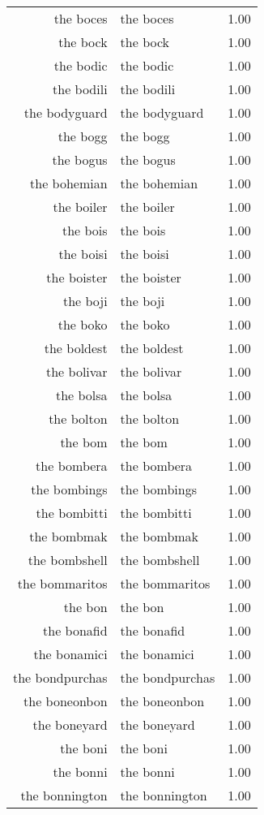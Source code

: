 \begin{table}[ht]
\begin{tabular}{rlr}
  the boces & the boces & 1.00 \\ 
  the bock & the bock & 1.00 \\ 
  the bodic & the bodic & 1.00 \\ 
  the bodili & the bodili & 1.00 \\ 
  the bodyguard & the bodyguard & 1.00 \\ 
  the bogg & the bogg & 1.00 \\ 
  the bogus & the bogus & 1.00 \\ 
  the bohemian & the bohemian & 1.00 \\ 
  the boiler & the boiler & 1.00 \\ 
  the bois & the bois & 1.00 \\ 
  the boisi & the boisi & 1.00 \\ 
  the boister & the boister & 1.00 \\ 
  the boji & the boji & 1.00 \\ 
  the boko & the boko & 1.00 \\ 
  the boldest & the boldest & 1.00 \\ 
  the bolivar & the bolivar & 1.00 \\ 
  the bolsa & the bolsa & 1.00 \\ 
  the bolton & the bolton & 1.00 \\ 
  the bom & the bom & 1.00 \\ 
  the bombera & the bombera & 1.00 \\ 
  the bombings & the bombings & 1.00 \\ 
  the bombitti & the bombitti & 1.00 \\ 
  the bombmak & the bombmak & 1.00 \\ 
  the bombshell & the bombshell & 1.00 \\ 
  the bommaritos & the bommaritos & 1.00 \\ 
  the bon & the bon & 1.00 \\ 
  the bonafid & the bonafid & 1.00 \\ 
  the bonamici & the bonamici & 1.00 \\ 
  the bondpurchas & the bondpurchas & 1.00 \\ 
  the boneonbon & the boneonbon & 1.00 \\ 
  the boneyard & the boneyard & 1.00 \\ 
  the boni & the boni & 1.00 \\ 
  the bonni & the bonni & 1.00 \\ 
  the bonnington & the bonnington & 1.00 \\ 

\end{tabular}
\end{table}
